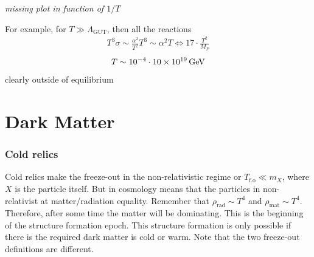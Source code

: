 \documentclass[12pt,letterpaper]{article}
\begin{document}
\emph{missing plot in function of $1/T$}

For example, for $T\gg \Lambda_{\text{GUT}}$, then all the reactions
\begin{align*}
  T^3\sigma\sim \frac{\alpha^2}{T^2}T^3\sim \alpha^2T\Leftrightarrow 17\cdot \frac{T^2}{M_P}
\end{align*}
\begin{align*}
  T\sim 10^{-4}\cdot \SI{10E19}{GeV}
\end{align*}
clearly outside of equilibrium

\section{Dark Matter}

\subsubsection{Cold relics}

Cold relics make the freeze-out in the non-relativistic regime or
$T_{\text{f.o}}\ll m_X$, where $X$ is the particle itself. But in
cosmology means that the particles in non-relativist at
matter/radiation equality. Remember that $\rho_{\text{rad}}\sim T^{4}$
and $\rho_{\text{mat}}\sim T^{4}$. Therefore, after some time the
matter will be dominating.  This is the beginning of the structure
formation epoch. This structure formation is only possible if there is
the required dark matter is cold or warm.  Note that the two
freeze-out definitions are different.
\end{document}
